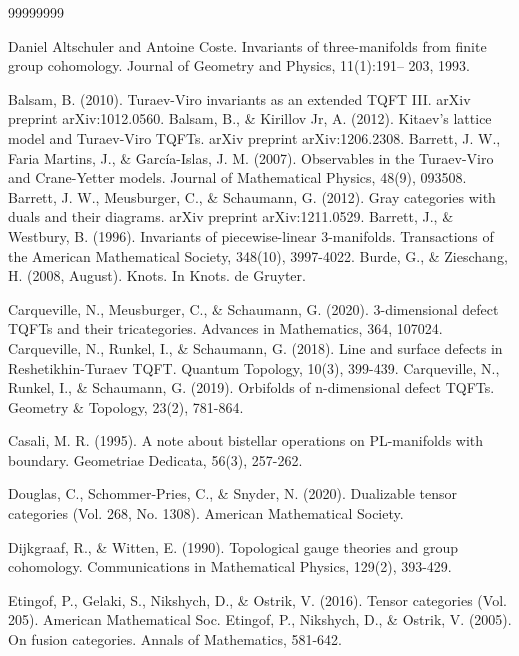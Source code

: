 \documentclass[1.5pt, a4paper]{article}
\begin{document}
\begin{thebibliography}{99999999}

 Daniel Altschuler and Antoine Coste. Invariants of three-manifolds from
finite group cohomology. Journal of Geometry and Physics, 11(1):191--
203, 1993.

 Balsam, B. (2010). Turaev-Viro invariants as an extended TQFT III. arXiv preprint arXiv:1012.0560.
 Balsam, B., \& Kirillov Jr, A. (2012). Kitaev's lattice model and Turaev-Viro TQFTs. arXiv preprint arXiv:1206.2308.
 Barrett, J. W., Faria Martins, J., \& Garc\'ia-Islas, J. M. (2007). Observables in the Turaev-Viro and Crane-Yetter models. Journal of Mathematical Physics, 48(9), 093508.
 Barrett, J. W., Meusburger, C., \& Schaumann, G. (2012). Gray categories with duals and their diagrams. arXiv preprint arXiv:1211.0529.
 Barrett, J., \& Westbury, B. (1996). Invariants of piecewise-linear 3-manifolds. Transactions of the American Mathematical Society, 348(10), 3997-4022.
 Burde, G., \& Zieschang, H. (2008, August). Knots. In Knots. de Gruyter.

 Carqueville, N., Meusburger, C., \& Schaumann, G. (2020). 3-dimensional defect TQFTs and their tricategories. Advances in Mathematics, 364, 107024.
 Carqueville, N., Runkel, I., \& Schaumann, G. (2018). Line and surface defects in Reshetikhin-Turaev TQFT. Quantum Topology, 10(3), 399-439.
 Carqueville, N., Runkel, I., \& Schaumann, G. (2019). Orbifolds of n-dimensional defect TQFTs. Geometry \& Topology, 23(2), 781-864.

 Casali, M. R. (1995). A note about bistellar operations on PL-manifolds with boundary. Geometriae Dedicata, 56(3), 257-262.

 Douglas, C., Schommer-Pries, C., \& Snyder, N. (2020). Dualizable tensor categories (Vol. 268, No. 1308). American Mathematical Society.

 Dijkgraaf, R., \& Witten, E. (1990). Topological gauge theories and group cohomology. Communications in Mathematical Physics, 129(2), 393-429.


 Etingof, P., Gelaki, S., Nikshych, D., \& Ostrik, V. (2016). Tensor categories (Vol. 205). American Mathematical Soc.
 Etingof, P., Nikshych, D., \& Ostrik, V. (2005). On fusion categories. Annals of Mathematics, 581-642.


\end{thebibliography}
\end{document}
